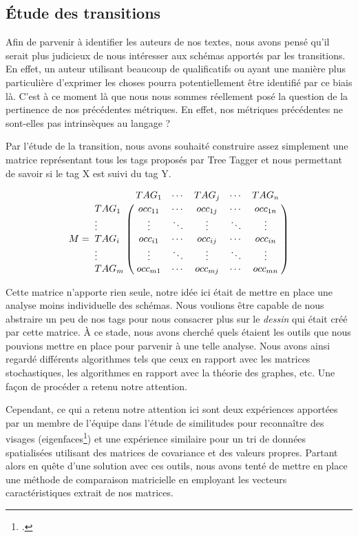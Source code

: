 \documentclass[a4paper,12pt]{report}
\begin{document}
\subsection{Étude des transitions}

Afin de parvenir à identifier les auteurs de nos textes, nous avons pensé qu'il serait plus judicieux de nous intéresser aux schémas apportés par les transitions. En effet, un auteur utilisant beaucoup de qualificatifs ou ayant une manière plus particulière d'exprimer les choses pourra potentiellement être identifié par ce biais là. C'est à ce moment là que nous nous sommes réellement posé la question de la pertinence de nos précédentes métriques. En effet, nos métriques précédentes ne sont-elles pas intrinsèques au langage ?

Par l'étude de la transition, nous avons souhaité construire assez simplement une matrice représentant tous les tags proposés par Tree Tagger et nous permettant de savoir si le tag X est suivi du tag Y.

\[M=\bordermatrix{
&TAG_{1}&\cdots&TAG_{j}&\cdots&TAG_{n}\cr
TAG_{1}& occ_{11} & \cdots & occ_{1j} & \cdots & occ_{1n} \cr
\vdots&\vdots&\ddots&\vdots&\ddots&\vdots\cr
TAG_{i}& occ_{i1} & \cdots & occ_{ij} & \cdots & occ_{in} \cr
\vdots&\vdots&\ddots&\vdots&\ddots&\vdots\cr
TAG_{m}& occ_{m1} & \cdots & occ_{mj} & \cdots & occ_{mn} \cr
}\]

Cette matrice n'apporte rien seule, notre idée ici était de mettre en place une analyse moins individuelle des schémas. Nous voulions être capable de nous abstraire un peu de nos tags pour nous consacrer plus sur le \textit{dessin} qui était créé par cette matrice. À ce stade, nous avons cherché quels étaient les outils que nous pouvions mettre en place pour parvenir à une telle analyse. Nous avons ainsi regardé différents algorithmes tels que ceux en rapport avec les matrices stochastiques, les algorithmes en rapport avec la théorie des graphes, etc. Une façon de procéder a retenu notre attention.

Cependant, ce qui a retenu notre attention ici sont deux expériences apportées par un membre de l'équipe dans l'étude de similitudes pour reconnaître des visages (eigenfaces\footcite{http://fr.wikipedia.org/wiki/Eigenface}) et une expérience similaire pour un tri de données spatialisées utilisant des matrices de covariance et des valeurs propres. Partant alors en quête d'une solution avec ces outils, nous avons tenté de mettre en place une méthode de comparaison matricielle en employant les vecteurs caractéristiques extrait de nos matrices.
\end{document}
